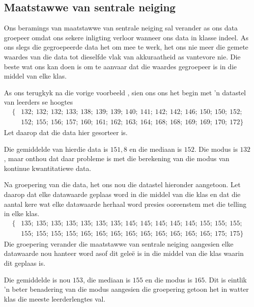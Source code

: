\subsection*{Maatstawwe van sentrale neiging}
Ons beramings van maatstawwe van sentrale neiging sal verander as ons data groepeer omdat ons sekere inligting verloor wanneer ons data in klasse indeel. As ons slegs die gegroepeerde data het om mee te werk, het ons nie meer die gemete waardes van die data tot dieselfde vlak van akkuraatheid as vantevore nie. Die beste wat ons kan doen is om te aanvaar dat die waardes gegroepeer is in die middel van elke klas.\par

As ons terugkyk na die vorige voorbeeld , sien ons ons het begin met ’n datastel van leerders se hoogtes
\begin{align*}
  \{&132;\ 132;\ 132;\ 133;\ 138;\ 139;\ 139;\ 140;\ 141;\ 142;\ 142;\ 146;\ 150;\ 150;\ 152;\\
    &152;\ 155;\ 156;\ 157;\ 160;\ 161;\ 162;\ 163;\ 164;\ 168;\ 168;\ 169;\ 169;\ 170;\ 172\}
\end{align*}
Let daarop dat die data hier gesorteer is.

Die gemiddelde van hierdie data is $151,8$ en die mediaan is $152$. Die modus is $132$, maar onthou dat daar probleme is met die berekening van die modus van kontinue kwantitatiewe data. \par

Na groepering van die data, het ons nou die datastel hieronder aangetoon. Let daarop dat elke datawaarde geplaas word in die middel van die klas en dat die aantal kere wat elke datawaarde herhaal word presies ooreenstem met die telling in elke klas. 
\begin{align*}
  \{&135;\ 135;\ 135;\ 135;\ 135;\ 135;\ 135;\ 145;\ 145;\ 145;\ 145;\ 145;\ 155;\ 155;\ 155;\\
    &155;\ 155;\ 155;\ 155;\ 165;\ 165;\ 165;\ 165;\ 165;\ 165;\ 165;\ 165;\ 165;\ 175;\ 175\}
\end{align*}
Die groepering verander die maatstawwe van sentrale neiging aangesien elke datawaarde nou hanteer word asof dit geleë is in die middel van die klas waarin dit geplaas is. \par
\clearpage
Die gemiddelde is nou $153$, die mediaan is $155$ en die modus is $165$. Dit is eintlik ’n beter benadering van die modus aangesien die groepering getoon het in watter klas die meeste leerderlengtes val. 


